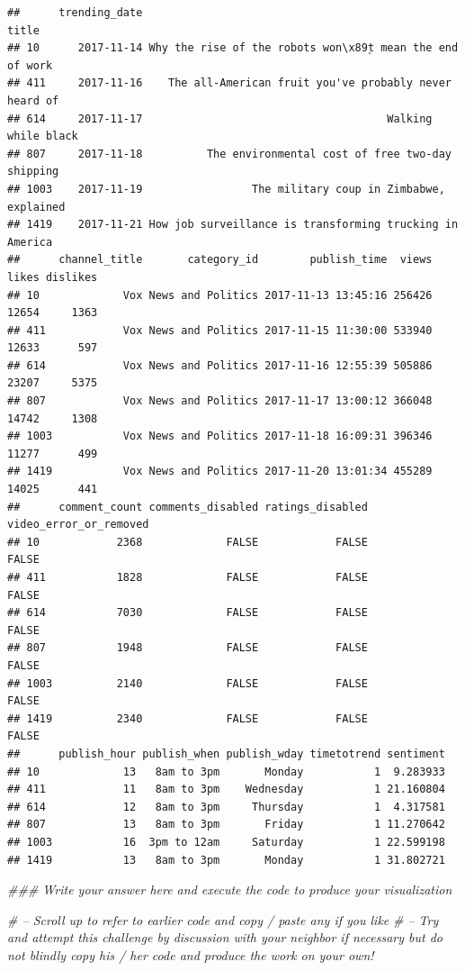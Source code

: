 \documentclass[]{article}
\newenvironment{Shaded}{\begin{snugshade}}{\end{snugshade}}
\newcommand{\CommentTok}[1]{\textcolor[rgb]{0.56,0.35,0.01}{\textit{#1}}}
\begin{document}
\begin{verbatim}
##      trending_date                                                    title
## 10      2017-11-14 Why the rise of the robots won\x89۪t mean the end of work
## 411     2017-11-16    The all-American fruit you've probably never heard of
## 614     2017-11-17                                      Walking while black
## 807     2017-11-18          The environmental cost of free two-day shipping
## 1003    2017-11-19                 The military coup in Zimbabwe, explained
## 1419    2017-11-21 How job surveillance is transforming trucking in America
##      channel_title       category_id        publish_time  views likes dislikes
## 10             Vox News and Politics 2017-11-13 13:45:16 256426 12654     1363
## 411            Vox News and Politics 2017-11-15 11:30:00 533940 12633      597
## 614            Vox News and Politics 2017-11-16 12:55:39 505886 23207     5375
## 807            Vox News and Politics 2017-11-17 13:00:12 366048 14742     1308
## 1003           Vox News and Politics 2017-11-18 16:09:31 396346 11277      499
## 1419           Vox News and Politics 2017-11-20 13:01:34 455289 14025      441
##      comment_count comments_disabled ratings_disabled video_error_or_removed
## 10            2368             FALSE            FALSE                  FALSE
## 411           1828             FALSE            FALSE                  FALSE
## 614           7030             FALSE            FALSE                  FALSE
## 807           1948             FALSE            FALSE                  FALSE
## 1003          2140             FALSE            FALSE                  FALSE
## 1419          2340             FALSE            FALSE                  FALSE
##      publish_hour publish_when publish_wday timetotrend sentiment
## 10             13   8am to 3pm       Monday           1  9.283933
## 411            11   8am to 3pm    Wednesday           1 21.160804
## 614            12   8am to 3pm     Thursday           1  4.317581
## 807            13   8am to 3pm       Friday           1 11.270642
## 1003           16  3pm to 12am     Saturday           1 22.599198
## 1419           13   8am to 3pm       Monday           1 31.802721
\end{verbatim}

\begin{Shaded}
\begin{Highlighting}[]
\CommentTok{### Write your answer here and execute the code to produce your visualization}

\CommentTok{# -- Scroll up to refer to earlier code and copy / paste any if you like }
\CommentTok{# -- Try and attempt this challenge by discussion with your neighbor if necessary but do not blindly copy his / her code and produce the work on your own!}
\end{Highlighting}
\end{Shaded}
\end{document}
